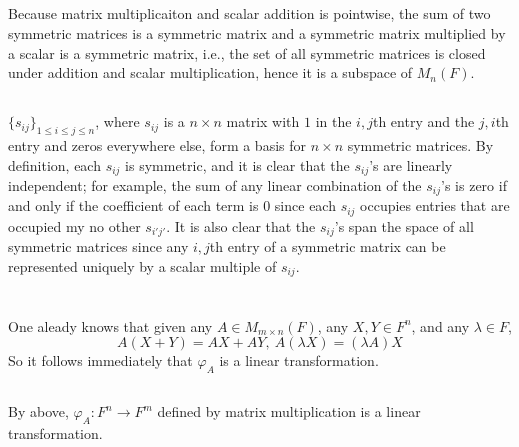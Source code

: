 \documentclass[12pt]{article}
\begin{document}
\subsection{}
Because matrix multiplicaiton and scalar addition is pointwise, the sum of two symmetric matrices is a symmetric matrix and a symmetric matrix multiplied by a scalar is a symmetric matrix, 
i.e., the set of all symmetric matrices is closed under addition and scalar multiplication, hence it is a subspace of $M_n(F)$. 

\subsection{}
$\{s_{ij}\}_{1 \leq i \leq j \leq n}$, where $s_{ij}$ is a $n \times n$ matrix with $1$ in the $i, j$th entry and the $j, i$th entry and zeros everywhere else, form a basis for $n \times n$ symmetric matrices.  
By definition, each $s_{ij}$ is symmetric, and it is clear that the $s_{ij}$'s are linearly independent; 
for example, the sum of any linear combination of the $s_{ij}$'s is zero if and only if the coefficient of each term is 0 since each $s_{ij}$ occupies entries that are occupied my no other $s_{i'j'}$.  
It is also clear that the $s_{ij}$'s span the space of all symmetric matrices since any $i, j$th entry of a symmetric matrix can be represented uniquely by a scalar multiple of $s_{ij}$. 

\section{}
\subsection{}
One aleady knows that given any $A \in M_{m \times n}(F)$, any $X, Y \in F^n$, and any $\lambda \in F$,
$$A(X + Y) = AX + AY, \: A(\lambda X) = (\lambda A) X$$
So it follows immediately that $\varphi_{A}$ is a linear transformation. 

\subsection{} 
By above, $\varphi_{A}: F^n \rightarrow F^m$ defined by matrix multiplication is a linear transformation. 
\end{document}
